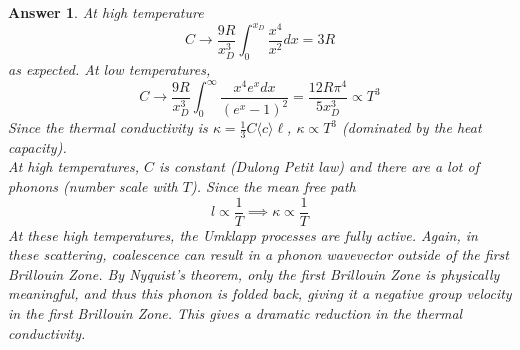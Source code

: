 \documentclass[a4paper]{article}
\newtheorem{ans}{Answer}[subsection]
\theoremstyle{new}
\begin{document}
\begin{ans}
At high temperature
$$C\rightarrow\frac{9R}{x_D^3}\int_0^{x_D}\frac{x^4}{x^2}dx=3R$$ 
as expected. At low temperatures,
$$C\rightarrow\frac{9R}{x_D^3}\int_0^\infty\frac{x^4e^xdx}{(e^x-1)^2}=\frac{12R\pi^4}{5x_D^3}\propto T^3$$
Since the thermal conductivity is $\kappa=\frac{1}{3}C\langle c\rangle\ell$, $\kappa\propto T^3$ (dominated by the heat capacity).\\[5pt]
At high temperatures, $C$ is constant (Dulong Petit law) and there are a lot of phonons (number scale with $T$). Since the mean free path 
$$l\propto\frac{1}{T}\implies\kappa\propto\frac{1}{T}$$
At these high temperatures, the Umklapp processes are fully active. Again, in these scattering, coalescence can result in a phonon wavevector outside of the first Brillouin Zone. By Nyquist's theorem, only the first Brillouin Zone is physically meaningful, and thus this phonon is folded back, giving it a negative group velocity in the first Brillouin Zone. This gives a dramatic reduction in the thermal conductivity.
\newpage

\end{ans}
\end{document}
